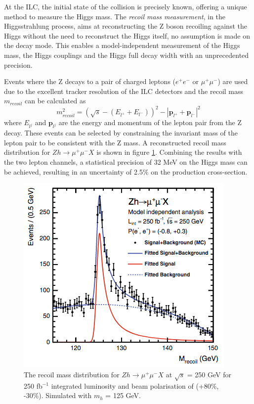 At the ILC, the initial state of the collision is precisely known, offering a unique method to measure the Higgs mass. The \textit{recoil mass measurement}, in the Higgsstrahlung process, aims at reconstructing the Z boson recoiling against the Higgs without the need to reconstruct the Higgs itself, no assumption is made on the decay mode. This enables a model-independent measurement of the Higgs mass, the Higgs couplings and the Higgs full decay width with an unprecedented precision.

Events where the Z decays to a pair of charged leptons ($e^+e^-$ or $\mu^+ \mu^-$) are used due to the excellent tracker resolution of the ILC detectors and the recoil mass $m_{recoil}$ can be calculated as \cite{Yan:2016xyx}
\begin{equation}
  m_{recoil}^2 = (\sqrt{s} - (E_{l^+} + E_{l^-}))^2 -  |\textbf{p}_{l^+} + \textbf{p}_{l^-}|^2
\end{equation}
where $E_{l^j}$ and $\textbf{p}_{l^j}$ are the energy and momentum of the lepton pair from the Z decay. These events can be selected by constraining the invariant mass of the lepton pair to be consistent with the Z mass. A reconstructed recoil mass distribution for $Zh \rightarrow \mu^+\mu^-X$ is shown in figure \ref{fig:HiggsRecoilMuMu}. Combining the results with the two lepton channels, a statistical precision of 32 MeV on the Higgs mass can be achieved, resulting in an uncertainty of 2.5\% on the production cross-section.

\begin{figure}[htbp]
  \centering
  \includegraphics[width=0.5\linewidth]{chap2/fig/HiggsRecoilMuMu.png}
  \caption{The recoil mass distribution for $Zh \rightarrow \mu^+\mu^-X$ at $\sqrt{s}$ = 250 GeV for 250 fb$^{-1}$ integrated luminosity and beam polarisation of (+80\%, -30\%). Simulated with $m_h$ = 125 GeV. \cite{Thomson2016}} \label{fig:HiggsRecoilMuMu}
\end{figure}

